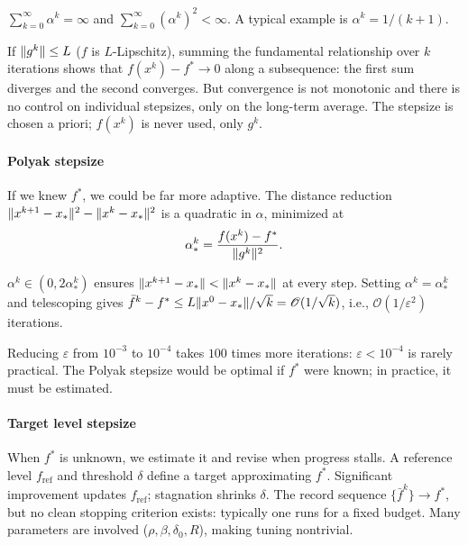 \begin{definition}\label{def:dss}
	$\sum_{k=0}^{\infty} \alpha^k = \infty$ and $\sum_{k=0}^{\infty} (\alpha^k)^2 < \infty$.
	A typical example is $\alpha^k = 1/(k+1)$.
\end{definition}

If $\lVert g^k\rVert \leq L$ ($f$ is $L$-Lipschitz), summing the fundamental relationship over $k$ iterations shows that $f(x^k) - f^* \to 0$ along a subsequence: the first sum diverges and the second converges.
But convergence is not monotonic and there is no control on individual stepsizes, only on the long-term average.
The stepsize is chosen a priori; $f(x^k)$ is never used, only $g^k$.

\paragraph{Polyak stepsize}

If we knew $f^*$, we could be far more adaptive.
The distance reduction $\lVert x^{k+1} - x_*\rVert^2 - \lVert x^k - x_*\rVert^2$ is a quadratic in $\alpha$, minimized at
\begin{equation}\label{eq:polyak-stepsize}
	\alpha^k_* = \frac{f(x^k) - f^*}{\lVert g^k\rVert^2}.
\end{equation}

\begin{definition}\label{def:polyak}
	$\alpha^k \in (0, 2\alpha^k_*)$ ensures $\lVert x^{k+1} - x_*\rVert < \lVert x^k - x_*\rVert$ at every step.
	Setting $\alpha^k = \alpha^k_*$ and telescoping gives
	$\bar{f}^k - f^* \leq L\lVert x^0 - x_*\rVert/\sqrt{k} = \mathcal{O}(1/\sqrt{k})$,
	i.e., $\mathcal{O}(1/\varepsilon^2)$ iterations.
\end{definition}

Reducing $\varepsilon$ from $10^{-3}$ to $10^{-4}$ takes $100$ times more iterations: $\varepsilon < 10^{-4}$ is rarely practical.
The Polyak stepsize would be optimal if $f^*$ were known; in practice, it must be estimated.

\paragraph{Target level stepsize}

When $f^*$ is unknown, we estimate it and revise when progress stalls.
A reference level $f_{\mathrm{ref}}$ and threshold $\delta$ define a target approximating $f^*$.
Significant improvement updates $f_{\mathrm{ref}}$; stagnation shrinks $\delta$.
The record sequence $\{\bar{f}^k\} \to f^*$, but no clean stopping criterion exists: typically one runs for a fixed budget.
Many parameters are involved ($\rho, \beta, \delta_0, R$), making tuning nontrivial.

